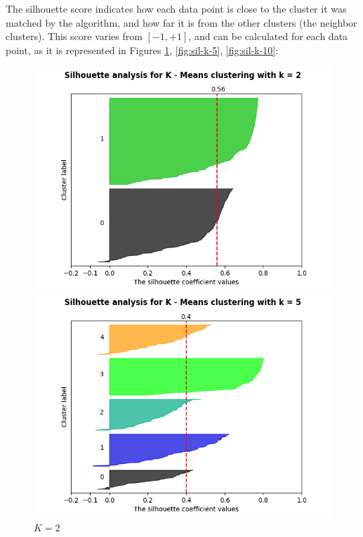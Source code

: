 \documentclass[12pt]{article}
\begin{document}
The silhouette score indicates how each data point is close to the cluster it was matched by the algorithm, and how far it is from the other clusters (the neighbor clusters). This score varies from $[-1, +1]$, and can be calculated for each data point, as it is represented in Figures \ref{fig:sil-k-2}, \ref{fig:sil-k-5}, \ref{fig:sil-k-10}: \\

\begin{figure}[H]
   \begin{minipage}{0.32\textwidth}
     \centering
     \includegraphics[width=\linewidth]{assignment-1/plots/task-1/silhouette-plot-k-2.png}
     \caption{$K = 2$}
     \label{fig:sil-k-2}
   \end{minipage}\hfill
   \begin{minipage}{0.32\textwidth}
     \centering
     \includegraphics[width=\linewidth]{assignment-1/plots/task-1/silhouette-plot-k-5.png}

\end{minipage}
\end{figure}
\end{document}
